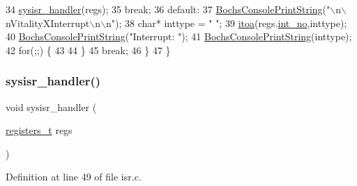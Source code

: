 \begin{DoxyCode}
34             \hyperlink{a00071_abd1fa375737cd5ecd84c082738e3b195_abd1fa375737cd5ecd84c082738e3b195}{sysisr\_handler}(regs);
35             \textcolor{keywordflow}{break};
36         \textcolor{keywordflow}{default}:
37             \hyperlink{a00041_a19e1f554d03c977f8b947f21489daa41_a19e1f554d03c977f8b947f21489daa41}{BochsConsolePrintString}(\textcolor{stringliteral}{"\(\backslash\)n\(\backslash\)nVitalityXInterrupt\(\backslash\)n\(\backslash\)n"});
38             \textcolor{keywordtype}{char}* inttype = \textcolor{stringliteral}{"  "};
39             \hyperlink{a00083_af749add1ff19b6ff96a62f35ebb49b7e_af749add1ff19b6ff96a62f35ebb49b7e}{itoa}(regs.\hyperlink{a00156_af311750a9b18afb3b1ed2d144fbe1cb0_af311750a9b18afb3b1ed2d144fbe1cb0}{int\_no},inttype);
40             \hyperlink{a00041_a19e1f554d03c977f8b947f21489daa41_a19e1f554d03c977f8b947f21489daa41}{BochsConsolePrintString}(\textcolor{stringliteral}{"Interrupt: "});
41             \hyperlink{a00041_a19e1f554d03c977f8b947f21489daa41_a19e1f554d03c977f8b947f21489daa41}{BochsConsolePrintString}(inttype);
42             \textcolor{keywordflow}{for}(;;) \{
43 
44             \}
45             \textcolor{keywordflow}{break};
46     \}
47 \}
\end{DoxyCode}
\mbox{\label{a00071_abd1fa375737cd5ecd84c082738e3b195_abd1fa375737cd5ecd84c082738e3b195}} 
\subsubsection{\texorpdfstring{sysisr\+\_\+handler()}{sysisr\_handler()}}
{\footnotesize\ttfamily void sysisr\+\_\+handler (\begin{DoxyParamCaption}\item[{\hyperlink{a00074_adf58dbaf6139b4957c348711f2026957_adf58dbaf6139b4957c348711f2026957}{registers\+\_\+t}}]{regs }\end{DoxyParamCaption})}



Definition at line 49 of file isr.\+c.


